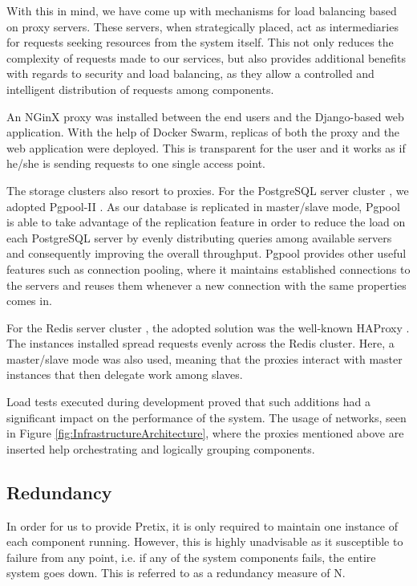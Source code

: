 \documentclass[12pt]{article}
\begin{document}
With this in mind, we have come up with mechanisms for load balancing based on proxy servers.
These servers, when strategically placed, act as intermediaries for requests seeking resources from the system itself.
This not only reduces the complexity of requests made to our services, but also provides additional benefits with regards to security and load balancing,
as they allow a controlled and intelligent distribution of requests among components.

An NGinX proxy \cite{nginx} was installed between the end users and the Django-based web application.
With the help of Docker Swarm, replicas of both the proxy and the web application were deployed.
This is transparent for the user and it works as if he/she is sending requests to one single access point.

The storage clusters also resort to proxies.
For the PostgreSQL server cluster \cite{postgresql}, we adopted Pgpool-II \cite{pgpool}.
As our database is replicated in master/slave mode, Pgpool is able to take advantage of the replication feature in order to reduce the load on each PostgreSQL server
by evenly distributing queries among available servers and consequently improving the overall throughput.
Pgpool provides other useful features such as connection pooling, where it maintains established connections to the servers and reuses them whenever a new
connection with the same properties comes in.

For the Redis server cluster \cite{redis}, the adopted solution was the well-known HAProxy \cite{haproxy}.
The instances installed spread requests evenly across the Redis cluster.
Here, a master/slave mode was also used, meaning that the proxies interact with master instances that then delegate work among slaves.

Load tests executed during development proved that such additions had a significant impact on the performance of the system.
The usage of networks, seen in Figure \ref{fig:InfrastructureArchitecture}, where the proxies mentioned above are inserted help orchestrating and logically
grouping components.

\subsection{Redundancy} \label{architecture.redundancy} %


In order for us to provide Pretix, it is only required to maintain one instance of each component running.
However, this is highly unadvisable as it susceptible to failure from any point, i.e. if any of the system components fails, the entire system goes down.
This is referred to as a redundancy measure of N.
\end{document}
